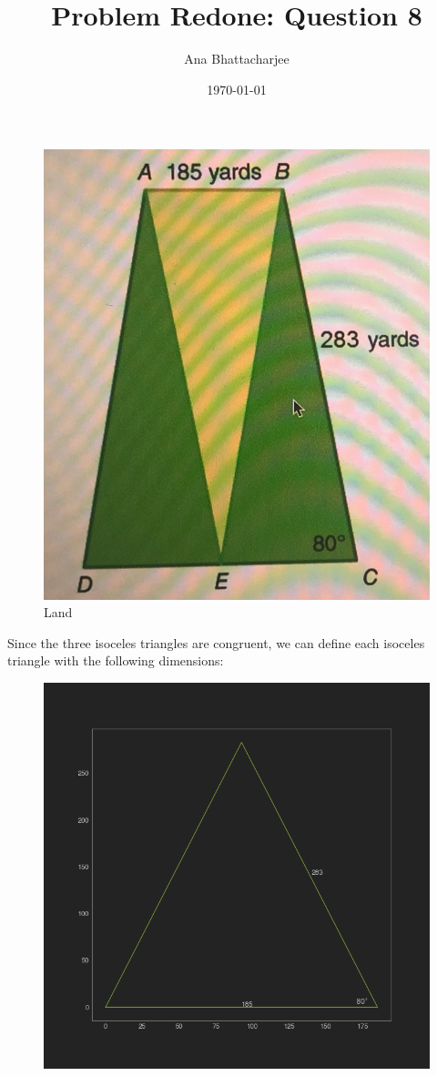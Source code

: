 \documentclass{article}
\begin{document}
\title{Problem Redone: Question 8}
\author{Ana Bhattacharjee}
\date{\today}
\maketitle

\begin{center}
  \begin{figure}[!htbp]
    \includegraphics[width=0.90\columnwidth]{new_image}
    \caption{Land}
  \end{figure}
  Since the three isoceles triangles are congruent, we can define each isoceles triangle with the following dimensions:
  \begin{figure}[!htbp]
    \includegraphics[width=0.90\columnwidth]{triangle}

\end{figure}
\end{center}
\end{document}
